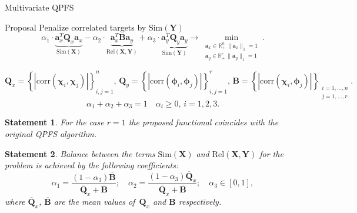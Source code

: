 \documentclass[9pt]{beamer}
\newcommand{\ba}{\mathbf{a}}
\newcommand{\bY}{\mathbf{Y}}
\newcommand{\bX}{\mathbf{X}}
\newcommand{\bB}{\mathbf{B}}
\newcommand{\bQ}{\mathbf{Q}}
\newcommand{\bbR}{\mathbb{R}}
\newcommand{\bchi}{\boldsymbol{\chi}}
\newcommand{\bphi}{\boldsymbol{\phi}}
\newtheorem{statement}{Statement}
\begin{document}
\begin{frame}{Multivariate QPFS}
\begin{block}{Proposal}
Penalize correlated targets by $\text{Sim} (\bY)$
\[
\alpha_1 \cdot \underbrace{\ba_x^{T} \bQ_x \ba_x}_{\text{Sim}(\bX)} - \alpha_2 \cdot \underbrace{\ba_x^{T} \bB \ba_y}_{\text{Rel}(\bX, \bY)} + \alpha_3 \cdot \underbrace{\ba_y^{T} \bQ_y \ba_y}_{\text{Sim}(\bY)} \rightarrow \min_{\substack{\ba_x \in \bbR^n_+ \, \|\ba_x\|_1=1 \\ \ba_y \in \bbR^r _+ \, \|\ba_y\|_1=1}}.
\]
\vspace{-0.5cm}
\end{block}
\[
\bQ_x = \left\{ \left| \text{corr}(\bchi_i, \bchi_j) \right| \right\}_{i,j=1}^n, \,
\bQ_y = \left\{ \left| \text{corr}(\bphi_i, \bphi_j) \right| \right\}_{i,j=1}^r, \,
\bB =  \left\{ \left| \text{corr}(\bchi_i, \bphi_j) \right| \right\}_{\substack{i=1, \dots, n \\ j=1, \dots, r}}.
\]
\[
\alpha_1 + \alpha_2 + \alpha_3 = 1 \quad \alpha_i \geq 0, \, i = 1, 2, 3.
\] 
\begin{statement}
	For the case $r=1$ the proposed functional coincides with the original QPFS algorithm.
\end{statement}

\begin{statement}
	Balance between the terms $\text{Sim}(\bX)$ and $\text{Rel}(\bX, \bY)$ for the problem is achieved by the following coefficients:
	\vspace{-0.2cm}
	\[
	\alpha_1 = \frac{(1 - \alpha_3)\overline{\bB}}{\overline{\bQ}_x + \overline{\bB}}; \quad
	\alpha_2 = \frac{(1 - \alpha_3)\overline{\bQ}_x}{\overline{\bQ}_x + \overline{\bB}}; \quad
	\alpha_3 \in [0, 1],
	\]
	where $\overline{\bQ}_x$, $\overline{\bB}$ are the mean values of~$\bQ_x$ and $\bB$ respectively.
\end{statement}
\end{frame}
\end{document}
